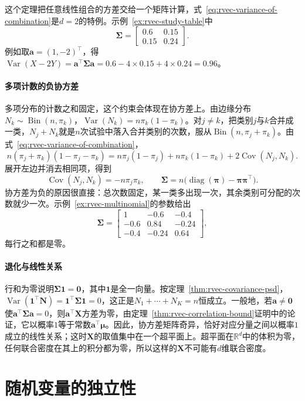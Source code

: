 这个定理把任意线性组合的方差交给一个矩阵计算，式~\eqref{eq:rvec-variance-of-combination}是$d=2$的特例。示例~\ref{ex:rvec-study-table}中
\[
 \bm\Sigma=\begin{bmatrix}0.6&0.15\\0.15&0.24\end{bmatrix}.
\]
例如取$\bm a=(1,-2)^{\top}$，得$\operatorname{Var}(X-2Y)=\bm a^{\top}\bm\Sigma\bm a=0.6-4\times0.15+4\times0.24=0.96$。

\paragraph{多项计数的负协方差}
多项分布的计数之和固定，这个约束会体现在协方差上。由边缘分布$N_k\sim\operatorname{Bin}(n,\pi_k)$，$\operatorname{Var}(N_k)=n\pi_k(1-\pi_k)$。对$j\neq k$，把类别$j$与$k$合并成一类，$N_j+N_k$就是$n$次试验中落入合并类别的次数，服从$\operatorname{Bin}(n,\pi_j+\pi_k)$。由式~\eqref{eq:rvec-variance-of-combination}，
\[
 n(\pi_j+\pi_k)(1-\pi_j-\pi_k)=n\pi_j(1-\pi_j)+n\pi_k(1-\pi_k)+2\operatorname{Cov}(N_j,N_k).
\]
展开左边并消去相同项，得到
\[
 \operatorname{Cov}(N_j,N_k)=-n\pi_j\pi_k ,\qquad
 \bm\Sigma=n\bigl(\operatorname{diag}(\bm\pi)-\bm\pi\bm\pi^{\top}\bigr).
\]
协方差为负的原因很直接：总次数固定，某一类多出现一次，其余类别可分配的次数就少一次。示例~\ref{ex:rvec-multinomial}的参数给出
\[
 \bm\Sigma=\begin{bmatrix}1&-0.6&-0.4\\-0.6&0.84&-0.24\\-0.4&-0.24&0.64\end{bmatrix},
\]
每行之和都是零。

\paragraph{退化与线性关系}
行和为零说明$\bm\Sigma\bm 1=\bm0$，其中$\bm1$是全一向量。按定理~\ref{thm:rvec-covariance-psd}，$\operatorname{Var}(\bm1^{\top}\bm N)=\bm1^{\top}\bm\Sigma\bm1=0$，这正是$N_1+\cdots+N_K=n$恒成立。一般地，若$\bm a\neq\bm0$使$\bm a^{\top}\bm\Sigma\bm a=0$，则$\bm a^{\top}\bm X$方差为零，由定理~\ref{thm:rvec-correlation-bound}证明中的论证，它以概率$1$等于常数$\bm a^{\top}\bm\mu$。因此，协方差矩阵奇异，恰好对应分量之间以概率$1$成立的线性关系；这时$\bm X$的取值集中在一个超平面上。超平面在$\mathbb R^d$中的体积为零，任何联合密度在其上的积分都为零，所以这样的$\bm X$不可能有$d$维联合密度。

\section{随机变量的独立性}
\label{sec:rvec-independence}

